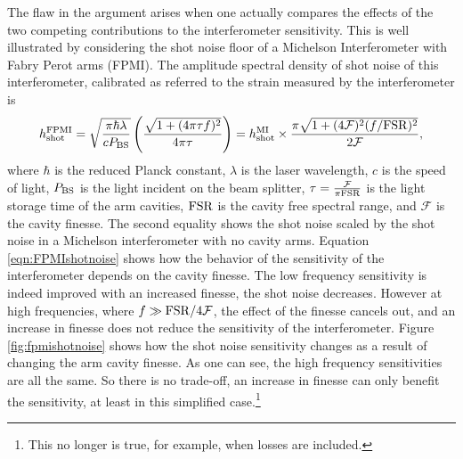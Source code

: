 The flaw in the argument arises when one actually compares the effects of the two competing contributions to the interferometer sensitivity. %
This is well illustrated by considering the shot noise floor of a Michelson Interferometer with Fabry Perot arms (FPMI). %
The amplitude spectral density of shot noise of this interferometer, calibrated as referred to the strain measured by the interferometer is \cite{LIGO}
\begin{equation}
\label{eqn:FPMIshotnoise}
h_{\rm{shot}}^{\rm{FPMI}}=\sqrt{\frac{\pi \hbar \lambda}{c P_{\rm{BS}}}}\left(\frac{\sqrt{1+(4 \pi\tau f)^2}}{4 \pi \tau }\right)=h_{\rm{shot}}^{\rm{MI}}\times \frac{\pi\sqrt{1+(4\mathcal{F})^2(f/\rm{FSR})^2}}{2 \mathcal{F}},
\end{equation}
where $\hbar$ is the reduced Planck constant, $\lambda$ is the laser wavelength, $c$ is the speed of light, $P_{\rm{BS}}$ is the light incident on the beam splitter, $\tau=\frac{\mathcal{F}}{\pi \rm{FSR}}$ is the light storage time of the arm cavities, $\rm{FSR}$ is the cavity free spectral range, and $\mathcal{F}$ is the cavity finesse. %
The second equality shows the shot noise scaled by the shot noise in a Michelson interferometer with no cavity arms. %
Equation \ref{eqn:FPMIshotnoise} shows how the behavior of the sensitivity of the interferometer depends on the cavity finesse. %
The low frequency sensitivity is indeed improved with an increased finesse, the shot noise decreases. %
However at high frequencies, where $f \gg \rm{FSR}/4\mathcal{F}$, the effect of the finesse cancels out, and an increase in finesse does not reduce the sensitivity of the interferometer. %
Figure \ref{fig:fpmishotnoise} shows how the shot noise sensitivity changes as a result of changing the arm cavity finesse. %
As one can see, the high frequency sensitivities are all the same. %
So there is no trade-off, an increase in finesse can only benefit the sensitivity, at least in this simplified case.\footnote{This no longer is true, for example, when losses are included.}

